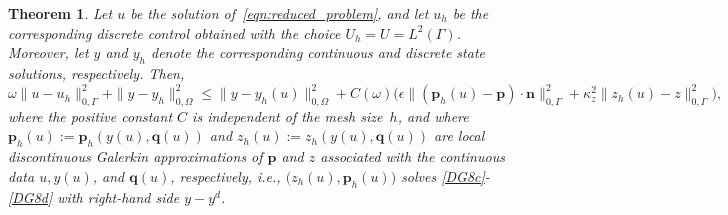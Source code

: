 \documentclass[a4paper,10pt]{article}
\newcommand{\bq}{{\mathbf{q}}}
\newcommand{\bp}{{\mathbf{p}}}
\newcommand{\bn}{{\mathbf{n}}}
\newtheorem{theorem}{Theorem}[section]
\numberwithin{theorem}{section}
\begin{document}
\begin{theorem}\label{thm:nodisc_adjoint_representation}
Let $u$ be the solution of~\eqref{eqn:reduced_problem}, and let 
$u_h$ be the corresponding discrete control obtained with the choice $U_h = U = L^2(\Gamma)$. 
Moreover, let $y$ and $y_h$ denote the corresponding continuous and discrete state solutions, respectively. 
Then, 
\begin{equation}\label{vge}
    \omega \| u - u_h \|_{0,\Gamma}^2  + \|y-y_h\|_{0,\Omega}^2 \le \|y-y_h(u)\|_{0,\Omega}^2 + C(\omega) 
     \big( \epsilon \|(\bp_h(u) - \bp)\cdot\bn\|_{0,\Gamma}^2 
         + \kappa_z^2\|z_h(u) - z\|_{0,\Gamma}^2 \big),
\end{equation}
where the positive constant $C$ is independent of the mesh size~$h$, and where $\bp_h(u):=\bp_h(y(u),\bq(u))$ and $z_h(u):=z_h(y(u),\bq(u))$ are local discontinuous Galerkin approximations of $\bp$ and $z$ associated with the continuous data $u, y(u)$, and $\bq(u)$, respectively, i.e., $\big(z_h(u),\bp_h(u)\big)$ solves \eqref{DG8c}-\eqref{DG8d} with right-hand side $y-y^d$.

\end{theorem}
\end{document}
